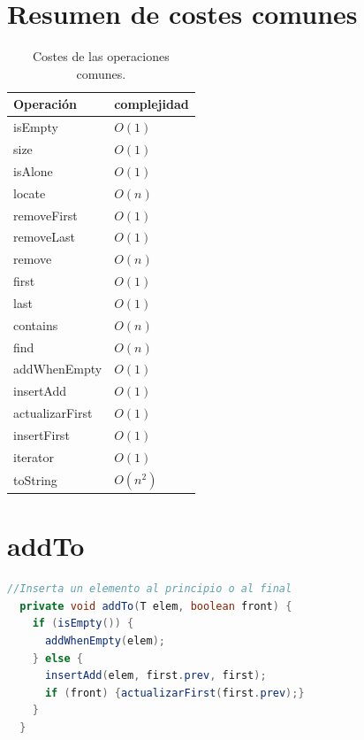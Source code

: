 \documentclass[a4paper,11pt]{report}
\begin{document}
\begin{table}[ht]
\section{\label{tablaResumen}Resumen de costes comunes}
\begin{minipage}{0.95\linewidth}
\centering
\renewcommand{\arraystretch}{1.3}
\begin{tabular}{>{\ttfamily}l l}
\toprule
\normalfont Operación & complejidad\\
\midrule
isEmpty & $O(1)$\\
size & $O(1)$\\
isAlone & $O(1)$\\
locate & $O(n)$\\
removeFirst & $O(1)$\\
removeLast & $O(1)$\\
remove & $O(n)$\\
first & $O(1)$\\
last & $O(1)$\\
contains & $O(n)$\\
find & $O(n)$\\
addWhenEmpty & $O(1)$\\
insertAdd & $O(1)$\\
actualizarFirst & $O(1)$\\
insertFirst & $O(1)$\\
iterator & $O(1)$\\
toString & $O(n^2)$\\

\bottomrule
\end{tabular}
\caption{Costes de las operaciones comunes.}
\end{minipage}\smallskip
\end{table}

\begin{minipage}{0.95\linewidth}
\section{\label{addTo}addTo}
\begin{lstlisting}[language=Java]
  //Inserta un elemento al principio o al final
  private void addTo(T elem, boolean front) {
    if (isEmpty()) {
      addWhenEmpty(elem);
    } else {
      insertAdd(elem, first.prev, first);
      if (front) {actualizarFirst(first.prev);}
    }
  }
\end{lstlisting}
\end{minipage}\smallskip
\end{document}
